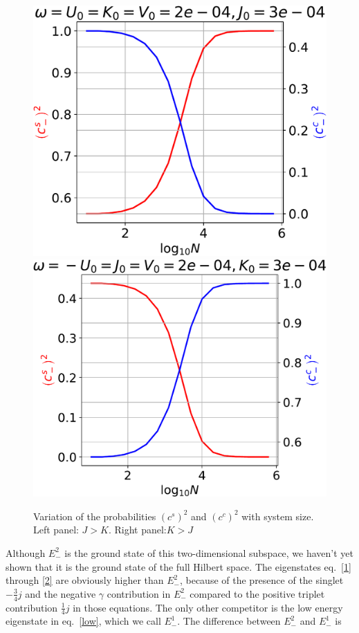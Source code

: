 \documentclass[12pt,twoside]{article}
\numberwithin{equation}{section}
\begin{document}
\begin{figure}[http]
	\centering
	\includegraphics[scale=0.5]{../figures/gamma_q1.pdf}\\
	\includegraphics[scale=0.5]{../figures/gamma_q3.pdf}
	\caption{Variation of the probabilities \(\left(c^s\right)^2\) and \(\left(c^c\right)^2\) with system size. Left panel: \(J>K\). Right panel:\(K>J\)}
	\label{fig:}
\end{figure}
Although \(E^2_-\) is the ground state of this two-dimensional subspace, we haven't yet shown that it is the ground state of the full Hilbert space. The eigenstates eq.~\ref{1} through \ref{2} are obviously higher than \(E_-^2\), because of the presence of the singlet \(- \frac{3}{4}j\) and the negative \(\gamma\) contribution in \(E_-^2\) compared to the positive triplet contribution \( \frac{1}{4}j\) in those equations. The only other competitor is the low energy eigenstate in eq.~\ref{low}, which we call \(E_-^1\). The difference between \(E_-^2\) and \(E_-^1\) is
\end{document}

